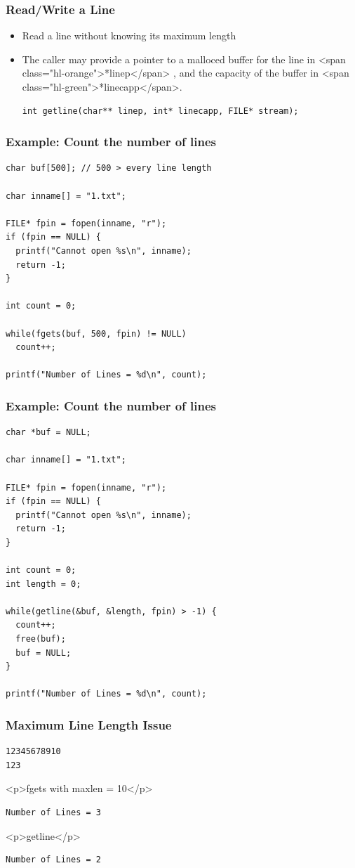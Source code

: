 \documentclass{../c-lecture}
\begin{document}
\begin{frame}[fragile]
  \frametitle{Read/Write a Line}
  \begin{itemize}
    \item Read a line without knowing its maximum length
    \item
      The caller may provide a pointer to a malloced buffer for the line in
      <span class="hl-orange">*linep</span> , and the capacity of the buffer in
      <span class="hl-green">*linecapp</span>.

    \begin{verbatim}
int getline(char** linep, int* linecapp, FILE* stream);
    \end{verbatim}
  \end{itemize}
\end{frame}

\begin{frame}[fragile]
  \frametitle{Example: Count the number of lines}
  \begin{verbatim}
char buf[500]; // 500 > every line length

char inname[] = "1.txt";

FILE* fpin = fopen(inname, "r");
if (fpin == NULL) {
  printf("Cannot open %s\n", inname);
  return -1;
}

int count = 0;

while(fgets(buf, 500, fpin) != NULL)
  count++;

printf("Number of Lines = %d\n", count);
  \end{verbatim}
\end{frame}

\begin{frame}[fragile]
  \frametitle{Example: Count the number of lines}
  \begin{verbatim}
char *buf = NULL;

char inname[] = "1.txt";

FILE* fpin = fopen(inname, "r");
if (fpin == NULL) {
  printf("Cannot open %s\n", inname);
  return -1;
}

int count = 0;
int length = 0;

while(getline(&buf, &length, fpin) > -1) {
  count++;
  free(buf);
  buf = NULL;
}

printf("Number of Lines = %d\n", count);
  \end{verbatim}
\end{frame}

\begin{frame}[fragile]
  \frametitle{Maximum Line Length Issue}
  \begin{verbatim}
12345678910
123
  \end{verbatim}
  <p>fgets with maxlen = 10</p>
  \begin{verbatim}
Number of Lines = 3
  \end{verbatim}
  <p>getline</p>
  \begin{verbatim}
Number of Lines = 2
  \end{verbatim}
\end{frame}
\end{document}
